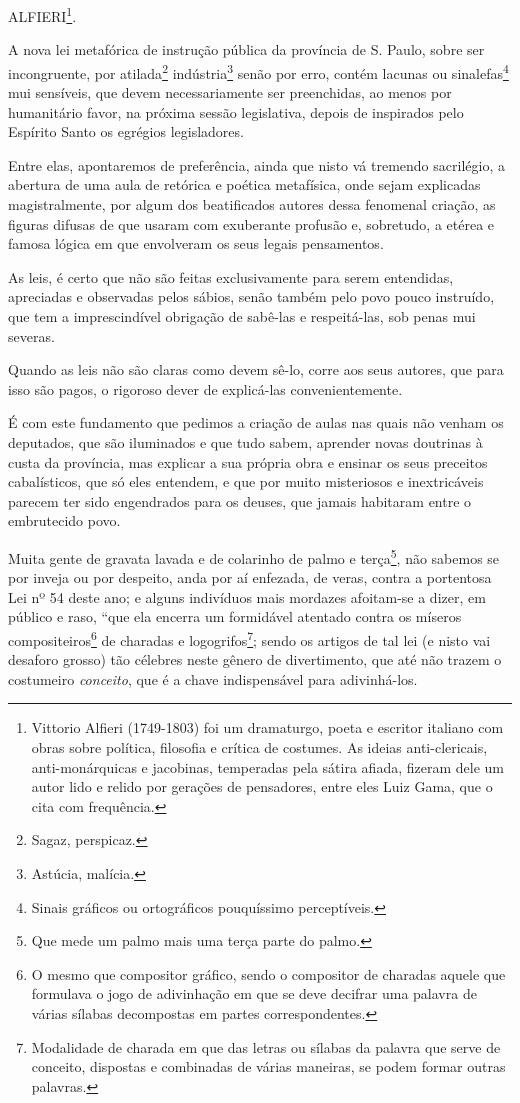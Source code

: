 ALFIERI\footnote{Vittorio Alfieri (1749-1803) foi um dramaturgo, poeta
  e escritor italiano com obras sobre política, filosofia e crítica de
  costumes. As ideias anti-clericais, anti-monárquicas e jacobinas,
  temperadas pela sátira afiada, fizeram dele um autor lido e relido por
  gerações de pensadores, entre eles Luiz Gama, que o cita com
  frequência.}.

A nova lei metafórica de instrução pública da província de S. Paulo,
sobre ser incongruente, por atilada\footnote{Sagaz, perspicaz.}
indústria\footnote{Astúcia, malícia.} senão por erro, contém lacunas
ou sinalefas\footnote{Sinais gráficos ou ortográficos pouquíssimo
  perceptíveis.} mui sensíveis, que devem necessariamente ser
preenchidas, ao menos por humanitário favor, na próxima sessão
legislativa, depois de inspirados pelo Espírito Santo os egrégios
legisladores.

Entre elas, apontaremos de preferência, ainda que nisto vá tremendo
sacrilégio, a abertura de uma aula de retórica e poética metafísica,
onde sejam explicadas magistralmente, por algum dos beatificados autores
dessa fenomenal criação, as figuras difusas de que usaram com exuberante
profusão e, sobretudo, a etérea e famosa lógica em que envolveram os
seus legais pensamentos.

As leis, é certo que não são feitas exclusivamente para serem
entendidas, apreciadas e observadas pelos sábios, senão também pelo povo
pouco instruído, que tem a imprescindível obrigação de sabê-las e
respeitá-las, sob penas mui severas.

Quando as leis não são claras como devem sê-lo, corre aos seus autores,
que para isso são pagos, o rigoroso dever de explicá-las
convenientemente.

É com este fundamento que pedimos a criação de aulas nas quais não
venham os deputados, que são iluminados e que tudo sabem, aprender novas
doutrinas à custa da província, mas explicar a sua própria obra e
ensinar os seus preceitos cabalísticos, que só eles entendem, e que por
muito misteriosos e inextricáveis parecem ter sido engendrados para os
deuses, que jamais habitaram entre o embrutecido povo.

Muita gente de gravata lavada e de colarinho de palmo e
terça\footnote{Que mede um palmo mais uma terça parte do palmo.}, não
sabemos se por inveja ou por despeito, anda por aí enfezada, de veras,
contra a portentosa Lei nº 54 deste ano; e alguns indivíduos mais
mordazes afoitam-se a dizer, em público e raso, ``que ela encerra um
formidável atentado contra os míseros compositeiros\footnote{O mesmo
  que compositor gráfico, sendo o compositor de charadas aquele que
  formulava o jogo de adivinhação em que se deve decifrar uma palavra de
  várias sílabas decompostas em partes correspondentes.} de charadas e
logogrifos\footnote{Modalidade de charada em que das letras ou sílabas
  da palavra que serve de conceito, dispostas e combinadas de várias
  maneiras, se podem formar outras palavras.}; sendo os artigos de tal
lei (e nisto vai desaforo grosso) tão célebres neste gênero de
divertimento, que até não trazem o costumeiro \emph{conceito}, que é a
chave indispensável para adivinhá-los.

